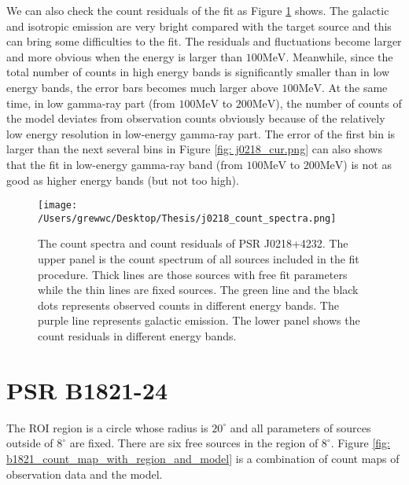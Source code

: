\documentclass[12pt]{report}
\newcommand{\Notice}[1]{
  $<$\textbf{Notice}$>$#1$<$\textbf{/Notice}$>$
}
\begin{document}

            We can also check the count residuals of the fit as Figure 
            \ref{fig: j0218_count_spectra} shows. The galactic and isotropic emission are very 
            bright compared with the target source and this can bring some difficulties to 
            the fit. The residuals and fluctuations become larger and more obvious 
            when the energy is larger than $100\mbox{MeV}$. 
            Meanwhile, since the total number of counts in high energy bands 
            is significantly smaller than in low energy bands, the error bars becomes much 
            larger above $100\mbox{MeV}$. At the same time, in low gamma-ray part 
            (from $100\mbox{MeV}$ to $200\mbox{MeV}$), the number of counts of the model 
            deviates from observation counts obviously because of the relatively low energy 
            resolution in low-energy gamma-ray part. The error of the first bin is larger
            than the next several bins in Figure \ref{fig: j0218_cur.png} can also shows that 
            the fit in low-energy gamma-ray band (from $100\mbox{MeV}$ to $200\mbox{MeV}$) 
            is not as good as higher energy bands (but not too high). 
            
            \begin{figure}[!ht]
              \centering
              \texttt{[image: /Users/grewwc/Desktop/Thesis/j0218\_count\_spectra.png]}
              \caption{The count spectra and count residuals of PSR J0218+4232.
                      The upper panel is the count spectrum of all sources included in the 
                      fit procedure. Thick lines are those sources with free fit parameters 
                      while the thin lines are fixed sources. The green line and the black 
                      dots represents observed counts in different energy bands. The purple 
                      line represents galactic emission. The lower panel shows the count 
                      residuals in different energy bands. } 
              \label{fig: j0218_count_spectra}
            \end{figure}

            \section{PSR B1821-24}
              The ROI region is a circle whose radius is $20^\circ$ and all 
              parameters of sources outside of $8^\circ$ are fixed. 
              There are six free sources in the region of $8^\circ$. Figure
              \ref{fig: b1821_count_map_with_region_and_model} 
              is a combination of count maps of observation data and the model. 
\end{document}
